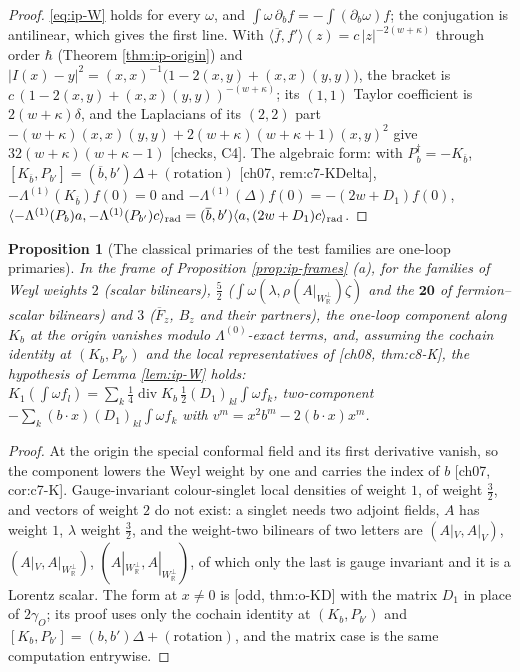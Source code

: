 \documentclass[11pt]{report}
\theoremstyle{plain}
\newtheorem{proposition}[theorem]{Proposition}
\theoremstyle{definition}
\numberwithin{equation}{chapter}
\newcommand{\Wp}{W_{\mathbb R}^\perp}
\newcommand{\rad}{{\rm rad}}
\begin{document}
\begin{proof}
\eqref{eq:ip-W} holds for every $\omega$, and $\int\omega\,\partial_bf=-\int(\partial_b\omega)f$; the conjugation is antilinear, which gives the first line. With $\langle\overline f,f'\rangle(z)=c\,|z|^{-2(w+\kappa)}$ through order $\hbar$ (Theorem \ref{thm:ip-origin}) and $|I(x)-y|^2=(x,x)^{-1}\big(1-2(x,y)+(x,x)(y,y)\big)$, the bracket is $c\,(1-2(x,y)+(x,x)(y,y))^{-(w+\kappa)}$; its $(1,1)$ Taylor coefficient is $2(w+\kappa)\delta$, and the Laplacians of its $(2,2)$ part $-(w+\kappa)(x,x)(y,y)+2(w+\kappa)(w+\kappa+1)(x,y)^2$ give $32(w+\kappa)(w+\kappa-1)$ [checks, C4]. The algebraic form: with $P_b^\dagger=-K_{\overline b}$, $[K_{\overline b},P_{b'}]=(\overline b,b')\Delta+(\text{rotation})$ [ch07, rem:c7-KDelta], $-\Lambda^{(1)}(K_{\overline b})f(0)=0$ and $-\Lambda^{(1)}(\Delta)f(0)=-(2w+D_1)f(0)$, $\langle-\Lambda^{(1)}(P_b)a,-\Lambda^{(1)}(P_{b'})c\rangle_\rad=(\overline b,b')\langle a,(2w+D_1)c\rangle_\rad$.
\end{proof}

\begin{proposition}[The classical primaries of the test families are one-loop primaries]
\label{prop:ip-primary}
In the frame of Proposition \ref{prop:ip-frames} (a), for the families of Weyl weights $2$ (scalar bilinears), $\tfrac52$ ($\int\omega(\lambda,\rho(A|_{\Wp})\zeta)$ and the $\mathbf{20}$ of fermion--scalar bilinears) and $3$ ($\overline F_z$, $B_z$ and their partners), the one-loop component along $K_b$ at the origin vanishes modulo $\Lambda^{(0)}$-exact terms, and, assuming the cochain identity at $(K_b,P_{b'})$ and the local representatives of [ch08, thm:c8-K], the hypothesis of Lemma \ref{lem:ip-W} holds: $K_1(\int\omega f_l)=\sum_k\tfrac14\operatorname{div}K_b\,\tfrac12(D_1)_{kl}\int\omega f_k$, two-component $-\sum_k(b\cdot x)(D_1)_{kl}\int\omega f_k$ with $v^m=x^2b^m-2(b\cdot x)x^m$.
\end{proposition}

\begin{proof}
At the origin the special conformal field and its first derivative vanish, so the component lowers the Weyl weight by one and carries the index of $b$ [ch07, cor:c7-K]. Gauge-invariant colour-singlet local densities of weight $1$, of weight $\tfrac32$, and vectors of weight $2$ do not exist: a singlet needs two adjoint fields, $A$ has weight $1$, $\lambda$ weight $\tfrac32$, and the weight-two bilinears of two letters are $(A|_V,A|_V)$, $(A|_V,A|_{\Wp})$, $(A|_{\Wp},A|_{\Wp})$, of which only the last is gauge invariant and it is a Lorentz scalar. The form at $x\neq0$ is [odd, thm:o-KD] with the matrix $D_1$ in place of $2\gamma_O$; its proof uses only the cochain identity at $(K_b,P_{b'})$ and $[K_b,P_{b'}]=(b,b')\Delta+(\text{rotation})$, and the matrix case is the same computation entrywise.
\end{proof}
\end{document}

